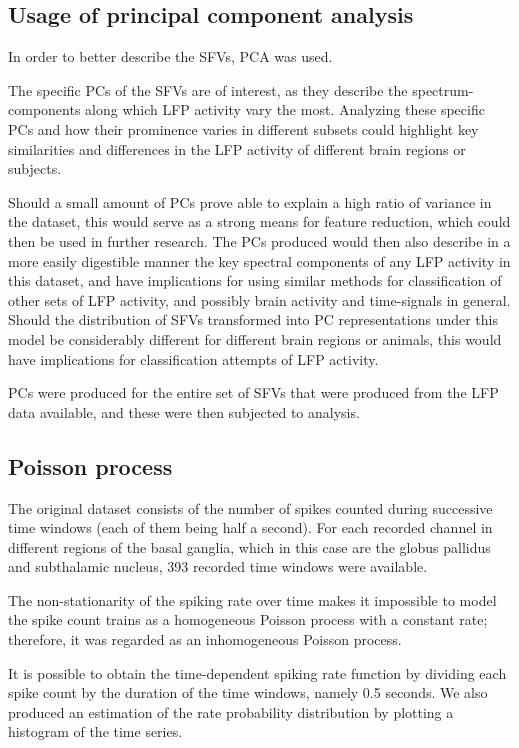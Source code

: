 \documentclass{article}
\begin{document}
\subsection{Usage of principal component analysis}\label{PCA Methods}

In order to better describe the SFVs, PCA was used.

The specific PCs of the SFVs are of interest, as they describe the spectrum-components along which LFP activity vary the most.
Analyzing these specific PCs and how their prominence varies in different subsets could highlight key similarities and differences in the LFP activity of different brain regions or subjects.

Should a small amount of PCs prove able to explain a high ratio of variance in the dataset, this would serve as a strong means for feature reduction, which could then be used in further research.
The PCs produced would then also describe in a more easily digestible manner the key spectral components of any LFP activity in this dataset, and have implications for using similar methods for classification of other sets of LFP activity, and possibly brain activity and time-signals in general.
Should the distribution of SFVs transformed into PC representations under this model be considerably different for different brain regions or animals, this would have implications for classification attempts of LFP activity.

PCs were produced for the entire set of SFVs that were produced from the LFP data available, and these were then subjected to analysis. 

\subsection{Poisson process}\label{Poiss Method}

The original dataset consists of the number of spikes counted during successive time windows (each of them being half a second). 
For each recorded channel in different regions of the basal ganglia, which in this case are the globus pallidus and subthalamic nucleus, 393 recorded time windows were available.

The non-stationarity of the spiking rate over time makes it impossible to model the spike count trains as a homogeneous Poisson process with a constant rate; therefore, it was regarded as an inhomogeneous Poisson process.

It is possible to obtain the time-dependent spiking rate function by dividing each spike count by the duration of the time windows, namely 0.5 seconds. 
We also produced an estimation of the rate probability distribution by plotting a histogram of the time series.
\end{document}
